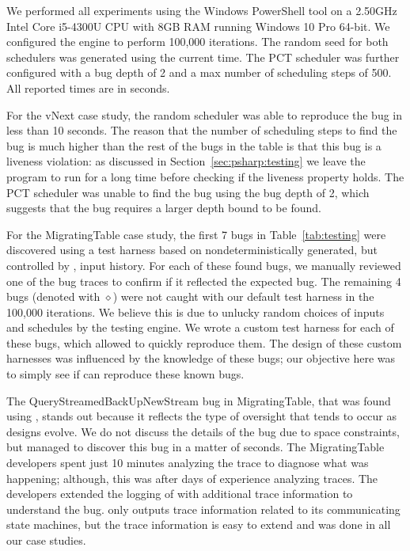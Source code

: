 We performed all experiments using the Windows PowerShell tool on a 2.50GHz Intel Core i5-4300U CPU with 8GB RAM running Windows 10 Pro 64-bit. We configured the engine to perform 100,000 iterations. The random seed for both schedulers was generated using the current time. The PCT scheduler was further configured with a bug depth of 2 and a max number of scheduling steps of 500. All reported times are in seconds.

For the vNext case study, the random scheduler was able to reproduce the bug in less than 10 seconds. The reason that the number of scheduling steps to find the bug is much higher than the rest of the bugs in the table is that this bug is a liveness violation: as discussed in Section~\ref{sec:psharp:testing} we leave the program to run for a long time before checking if the liveness property holds. The PCT scheduler was unable to find the bug using the bug depth of 2, which suggests that the bug requires a larger depth bound to be found.

For the MigratingTable case study, the first 7 bugs in Table~\ref{tab:testing} were discovered using a \psharp test harness based on nondeterministically generated, but controlled by \psharp, input history. For each of these found bugs, we manually reviewed one of the bug traces to confirm if it reflected the expected bug. The remaining 4 bugs (denoted with $\diamond$) were not caught with our default test harness in the 100,000 iterations. We believe this is due to unlucky random choices of inputs and schedules by the \psharp testing engine. We wrote a custom \psharp test harness for each of these bugs, which allowed \psharp to quickly reproduce them. The design of these custom harnesses was influenced by the knowledge of these bugs; our objective here was to simply see if \psharp can reproduce these known bugs.

The QueryStreamedBackUpNewStream bug in MigratingTable, that was found using \psharp, stands out because it reflects the type of oversight that tends to occur as designs evolve. We do not discuss the details of the bug due to space constraints, but \psharp managed to discover this bug in a matter of seconds. The MigratingTable developers spent just 10 minutes analyzing the trace to diagnose what was happening; although, this was after days of experience analyzing traces. The developers extended the logging of \psharp with additional trace information to understand the bug. \psharp only outputs trace information related to its communicating state machines, but the trace information is easy to extend and was done in all our case studies.

